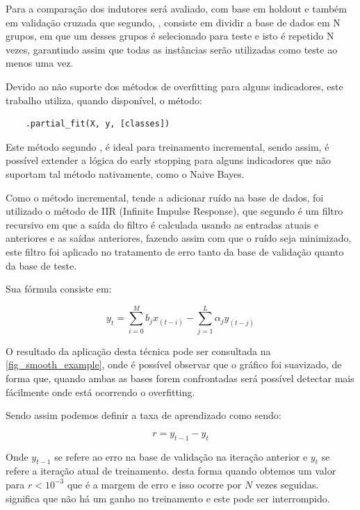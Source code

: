 \documentclass[
article,			%
11pt,				%
oneside,			%
a4paper,			%
english,			%
brazil,				%
sumario=tradicional,
]{abntex2}
\begin{document}
	Para a comparação dos indutores será avaliado, com base em holdout e também em validação cruzada que segundo, , consiste em dividir a base de dados em N grupos, em que um desses grupos é selecionado para teste e isto é repetido N vezes, garantindo assim que todas as instâncias serão utilizadas como teste ao menos uma vez.
	
	Devido ao não suporte dos métodos de overfitting para alguns indicadores, este trabalho utiliza, quando disponível, o método:
	
	\begin{verbatim}
	.partial_fit(X, y, [classes])
	\end{verbatim}
	
	Este método segundo , é ideal para treinamento incremental, sendo assim, é possível extender a lógica do early stopping para alguns indicadores que não suportam tal método nativamente, como o Naive Bayes.
	
	Como o método incremental, tende a adicionar ruído na base de dados, foi utilizado o método de IIR (Infinite Impulse Response), que segundo  é um filtro recursivo em que a saída do filtro é calculada usando as entradas atuais e anteriores e as saídas anteriores, fazendo assim com que o ruído seja minimizado, este filtro foi aplicado no tratamento de erro tanto da base de validação quanto da base de teste.
	
	Sua fórmula consiste em:
	
	\begin{equation}
	y_t = \sum_{i=0}^M b_jx_(t-i) - \sum_{j=1}^{L} \alpha_j y_(t-j)
	\end{equation}
	
	O resultado da aplicação desta técnica pode ser consultada na  \autoref{fig_smooth_example}, onde é possível observar que o gráfico foi suavizado, de forma que, quando ambas as bases forem confrontadas será possível detectar mais fácilmente onde está ocorrendo o overfitting.
	
	Sendo assim podemos definir a taxa de aprendizado como sendo:
	
	\begin{equation}
	r = {y_{t-1}} - {y_{t}}
	\end{equation}
	
	Onde \({y_{t-1}} \) se refere ao erro na base de validação na iteração anterior e \({y_t}\) se refere a iteração atual de treinamento. desta forma quando obtemos um valor para \(r < {10^{-3}}\) que é a margem de erro e isso ocorre por \(N\) vezes seguidas. significa que não há um ganho no treinamento e este pode ser interrompido.
 	
\end{document}
